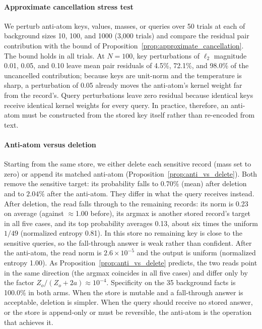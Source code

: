 \documentclass[preprint,12pt]{elsarticle}
\newif\ifmarkchanges
\newcommand{\rev}[1]{\ifmarkchanges{\color{blue}#1}\else#1\fi}
\begin{document}
\paragraph{Approximate cancellation stress test}
We perturb anti-atom keys, values, masses, or queries over 50 trials at each of background sizes 10, 100, and 1000 (3,000 trials) and compare the residual pair contribution with the bound of Proposition~\ref{prop:approximate_cancellation}. The bound holds in all trials. At $N=100$, key perturbations of $\ell_2$ magnitude 0.01, 0.05, and 0.10 leave mean pair residuals of 4.5\%, 72.1\%, and 98.0\% of the uncancelled contribution; because keys are unit-norm and the temperature is sharp, a perturbation of 0.05 already moves the anti-atom's kernel weight far from the record's. Query perturbations leave zero residual because identical keys receive identical kernel weights for every query. In practice, therefore, an anti-atom must be constructed from the stored key itself rather than re-encoded from text.

\paragraph{Anti-atom versus deletion}
\rev{Starting from the same store, we either delete each sensitive record (mass set to zero) or append its matched anti-atom (Proposition~\ref{prop:anti_vs_delete}). Both remove the sensitive target: its probability falls to 0.70\% (mean) after deletion and to $2.04\%$ after the anti-atom. They differ in what the query receives instead. After deletion, the read falls through to the remaining records: its norm is 0.23 on average (against $\approx$1.00 before), its argmax is another stored record's target in all five cases, and its top probability averages 0.13, about six times the uniform $1/49$ (normalized entropy 0.81). In this store no remaining key is close to the sensitive queries, so the fall-through answer is weak rather than confident. After the anti-atom, the read norm is $2.6\times10^{-5}$ and the output is uniform (normalized entropy 1.00). As Proposition~\ref{prop:anti_vs_delete} predicts, the two reads point in the same direction (the argmax coincides in all five cases) and differ only by the factor $Z_o/(Z_o+2a)\approx10^{-4}$. Specificity on the 35 background facts is 100.0\% in both arms. When the store is mutable and a fall-through answer is acceptable, deletion is simpler. When the query should receive no stored answer, or the store is append-only or must be reversible, the anti-atom is the operation that achieves it.}
\end{document}
